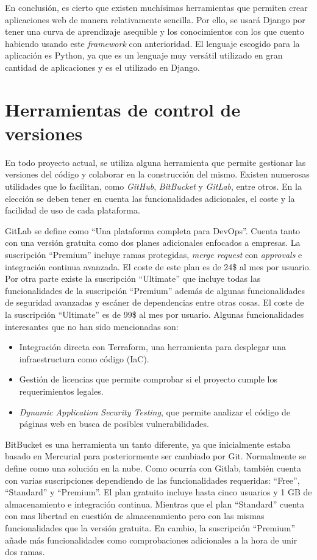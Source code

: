 En conclusión, es cierto que existen muchísimas herramientas que permiten crear aplicaciones web de manera relativamente sencilla. Por ello, se usará Django por tener una curva de aprendizaje asequible y los conocimientos con los que cuento habiendo usando este \emph{framework} con anterioridad. El lenguaje escogido para la aplicación es Python, ya que es un lenguaje muy versátil utilizado en gran cantidad de aplicaciones y es el utilizado en Django. 

\section{Herramientas de control de versiones}
En todo proyecto actual, se utiliza alguna herramienta que permite gestionar las versiones del código y colaborar en la construcción del mismo. Existen numerosas utilidades que lo facilitan, como \emph{GitHub}, \emph{BitBucket} y \emph{GitLab}, entre otros. En la elección se deben tener en cuenta las funcionalidades adicionales, el coste y la facilidad de uso de cada plataforma.

GitLab se define como ``Una plataforma completa para DevOps''. Cuenta tanto con una versión gratuita como dos planes adicionales enfocados a empresas. La suscripción ``Premium'' incluye ramas protegidas, \emph{merge request} con \emph{approvals} e integración continua avanzada. El coste de este plan es de 24\$ al mes por usuario. Por otra parte existe la suscripción ``Ultimate'' que incluye todas las funcionalidades de la suscripción ``Premium'' además de algunas funcionalidades de seguridad avanzadas y escáner de dependencias entre otras cosas. El coste de la suscripción ``Ultimate'' es de 99\$ al mes por usuario. Algunas funcionalidades interesantes que no han sido mencionadas son:
\begin{itemize}
    \item Integración directa con Terraform, una herramienta para desplegar una infraestructura como código (IaC).
    \item Gestión de licencias que permite comprobar si el proyecto cumple los requerimientos legales. 
    \item \emph{Dynamic Application Security Testing}, que permite analizar el código de páginas web en busca de posibles vulnerabilidades.
\end{itemize}

BitBucket es una herramienta un tanto diferente, ya que inicialmente estaba basado en Mercurial para posteriormente ser cambiado por Git. Normalmente se define como una solución en la nube. Como ocurría con Gitlab, también cuenta con varias suscripciones dependiendo de las funcionalidades requeridas: ``Free'', ``Standard'' y ``Premium''. El plan gratuito incluye hasta cinco usuarios y 1 GB de almacenamiento e integración continua. Mientras que el plan ``Standard'' cuenta con mas libertad en cuestión de almacenamiento pero con las mismas funcionalidades que la versión gratuita. En cambio, la suscripción ``Premium'' añade más funcionalidades como comprobaciones adicionales a la hora de unir dos ramas. 


